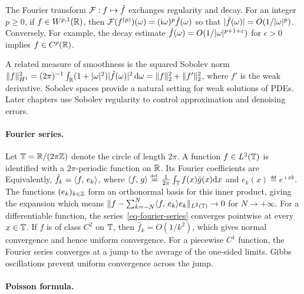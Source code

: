 The Fourier transform $\mathcal{F} : f \mapsto \hat f$ exchanges regularity and decay. For an integer $p\geq0$, if $f\in W^{p,1}(\mathbb{R})$, then $\mathcal{F}(f^{(p)})(\omega) = (\mathrm{i} \omega)^{p} \hat f(\omega)$ so that $|\hat f(\omega)|=O(1/|\omega|^p)$.
%
Conversely, 
For example, the decay estimate $\hat f(\omega)=O(1/|\omega|^{p+1+\varepsilon})$ for $\epsilon>0$ implies $f \in C^p(\mathbb{R})$.

A related measure of smoothness is the squared Sobolev norm $\|f\|_{H^1}^2=(2\pi)^{-1}\int_{\mathbb{R}} (1+|\omega|^2)|\hat f(\omega)|^2\,\mathrm{d}\omega=\|f\|_2^2+\|f'\|_2^2$, where $f'$ is the weak derivative. Sobolev spaces provide a natural setting for weak solutions of PDEs. Later chapters use Sobolev regularity to control approximation and denoising errors.

\paragraph{Fourier series.}

Let $\mathbb{T}=\mathbb{R}/(2\pi\mathbb{Z})$ denote the circle of length $2\pi$.
%
A function $f\in L^2(\mathbb{T})$ is identified with a $2\pi$-periodic function on $\mathbb{R}$. Its Fourier coefficients are
Equivalently, $\hat f_k = \langle f,\,e_k\rangle$, where $\langle f,\,g\rangle \stackrel{\mbox{\upshape\tiny def.}}{=} \frac{1}{2\pi} \int_{\mathbb{T}} f(x) \bar g(x) \mathrm{d} x$ and $e_k(x) \eqdef e^{\imath x k}$.
%
The functions $(e_k)_{k\in\mathbb{Z}}$ form an orthonormal basis for this inner product, giving the expansion
which means $\lVert f-\sum_{k=-N}^N \langle f,\,e_k\rangle e_k\rVert_{L^2(\mathbb{T})} \rightarrow 0$ for $N \rightarrow +\infty$.
%
For a differentiable function, the series~\eqref{eq-fourier-series} converges pointwise at every $x \in \mathbb{T}$. If $f$ is of class $C^2$ on $\mathbb{T}$, then $\hat f_k = O(1/k^2)$, which gives normal convergence and hence uniform convergence.
%
For a piecewise $C^1$ function, the Fourier series converges at a jump to the average of the one-sided limits. Gibbs oscillations prevent uniform convergence across the jump.


\paragraph{Poisson formula.}

